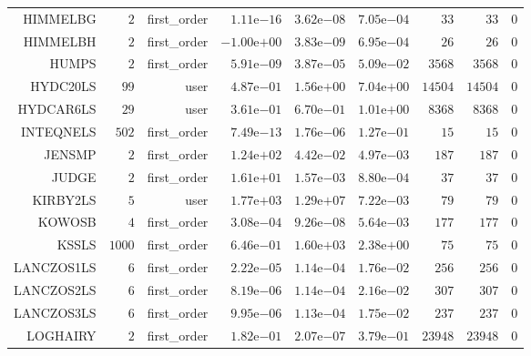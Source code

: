 \begin{longtable}{rrrrrrrrr}
HIMMELBG & \(     2\) & first\_order & \( 1.11\)e\(-16\) & \( 3.62\)e\(-08\) & \( 7.05\)e\(-04\) & \(    33\) & \(    33\) & \(     0\) \\
HIMMELBH & \(     2\) & first\_order & \(-1.00\)e\(+00\) & \( 3.83\)e\(-09\) & \( 6.95\)e\(-04\) & \(    26\) & \(    26\) & \(     0\) \\
HUMPS & \(     2\) & first\_order & \( 5.91\)e\(-09\) & \( 3.87\)e\(-05\) & \( 5.09\)e\(-02\) & \(  3568\) & \(  3568\) & \(     0\) \\
HYDC20LS & \(    99\) & user & \( 4.87\)e\(-01\) & \( 1.56\)e\(+00\) & \( 7.04\)e\(+00\) & \( 14504\) & \( 14504\) & \(     0\) \\
HYDCAR6LS & \(    29\) & user & \( 3.61\)e\(-01\) & \( 6.70\)e\(-01\) & \( 1.01\)e\(+00\) & \(  8368\) & \(  8368\) & \(     0\) \\
INTEQNELS & \(   502\) & first\_order & \( 7.49\)e\(-13\) & \( 1.76\)e\(-06\) & \( 1.27\)e\(-01\) & \(    15\) & \(    15\) & \(     0\) \\
JENSMP & \(     2\) & first\_order & \( 1.24\)e\(+02\) & \( 4.42\)e\(-02\) & \( 4.97\)e\(-03\) & \(   187\) & \(   187\) & \(     0\) \\
JUDGE & \(     2\) & first\_order & \( 1.61\)e\(+01\) & \( 1.57\)e\(-03\) & \( 8.80\)e\(-04\) & \(    37\) & \(    37\) & \(     0\) \\
KIRBY2LS & \(     5\) & user & \( 1.77\)e\(+03\) & \( 1.29\)e\(+07\) & \( 7.22\)e\(-03\) & \(    79\) & \(    79\) & \(     0\) \\
KOWOSB & \(     4\) & first\_order & \( 3.08\)e\(-04\) & \( 9.26\)e\(-08\) & \( 5.64\)e\(-03\) & \(   177\) & \(   177\) & \(     0\) \\
KSSLS & \(  1000\) & first\_order & \( 6.46\)e\(-01\) & \( 1.60\)e\(+03\) & \( 2.38\)e\(+00\) & \(    75\) & \(    75\) & \(     0\) \\
LANCZOS1LS & \(     6\) & first\_order & \( 2.22\)e\(-05\) & \( 1.14\)e\(-04\) & \( 1.76\)e\(-02\) & \(   256\) & \(   256\) & \(     0\) \\
LANCZOS2LS & \(     6\) & first\_order & \( 8.19\)e\(-06\) & \( 1.14\)e\(-04\) & \( 2.16\)e\(-02\) & \(   307\) & \(   307\) & \(     0\) \\
LANCZOS3LS & \(     6\) & first\_order & \( 9.95\)e\(-06\) & \( 1.13\)e\(-04\) & \( 1.75\)e\(-02\) & \(   237\) & \(   237\) & \(     0\) \\
LOGHAIRY & \(     2\) & first\_order & \( 1.82\)e\(-01\) & \( 2.07\)e\(-07\) & \( 3.79\)e\(-01\) & \( 23948\) & \( 23948\) & \(     0\) \\

\end{longtable}

